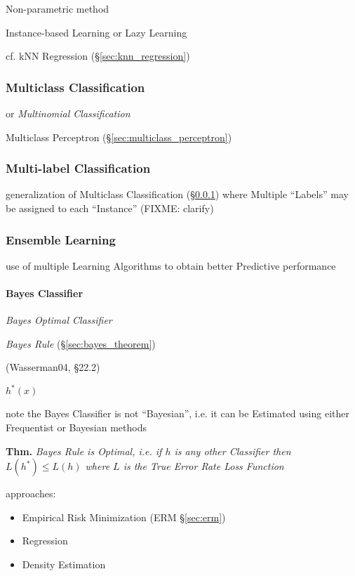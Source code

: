 Non-parametric method

Instance-based Learning or Lazy Learning

cf. kNN Regression (\S\ref{sec:knn_regression})



\subsubsection{Multiclass Classification}\label{sec:multiclass}

or \emph{Multinomial Classification}

Multiclass Perceptron (\S\ref{sec:multiclass_perceptron})



\subsubsection{Multi-label Classification}\label{sec:multilabel}

generalization of Multiclass Classification (\S\ref{sec:multiclass}) where
Multiple ``Labels'' may be assigned to each ``Instance'' (FIXME: clarify)



\subsubsection{Ensemble Learning}\label{sec:ensemble_learning}

use of multiple Learning Algorithms to obtain better Predictive performance



\paragraph{Bayes Classifier}\label{sec:bayes_classifier}\hfill

\emph{Bayes Optimal Classifier}

\emph{Bayes Rule} (\S\ref{sec:bayes_theorem})

(Wasserman04, \S22.2)

$h^*(x)$

note the Bayes Classifier is not ``Bayesian'', i.e. it can be Estimated using
either Frequentist or Bayesian methods

\textbf{Thm.} \emph{Bayes Rule is Optimal, i.e. if $h$ is any other Classifier
  then $L(h^*) \leq L(h)$ where $L$ is the True Error Rate Loss Function}

approaches:
\begin{itemize}
  \item Empirical Risk Minimization (ERM \S\ref{sec:erm})
  \item Regression
  \item Density Estimation
\end{itemize}

